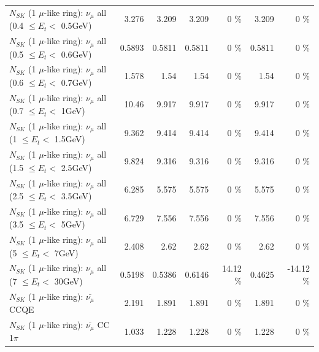 \begin{table}
\begin{tabular}{| l | r | r | r  r | r  r |}
       $N_{SK}$ (1 $\mu$-like ring): $\nu_{\mu}$ all (0.4 $\leq E_{t} <$ 0.5GeV) &           3.276 &           3.209 &           3.209 &        0 \%  &           3.209 &        0 \%  \\ 
       $N_{SK}$ (1 $\mu$-like ring): $\nu_{\mu}$ all (0.5 $\leq E_{t} <$ 0.6GeV) &          0.5893 &          0.5811 &          0.5811 &        0 \%  &          0.5811 &        0 \%  \\ 
       $N_{SK}$ (1 $\mu$-like ring): $\nu_{\mu}$ all (0.6 $\leq E_{t} <$ 0.7GeV) &           1.578 &            1.54 &            1.54 &        0 \%  &            1.54 &        0 \%  \\ 
         $N_{SK}$ (1 $\mu$-like ring): $\nu_{\mu}$ all (0.7 $\leq E_{t} <$ 1GeV) &           10.46 &           9.917 &           9.917 &        0 \%  &           9.917 &        0 \%  \\ 
         $N_{SK}$ (1 $\mu$-like ring): $\nu_{\mu}$ all (1 $\leq E_{t} <$ 1.5GeV) &           9.362 &           9.414 &           9.414 &        0 \%  &           9.414 &        0 \%  \\ 
       $N_{SK}$ (1 $\mu$-like ring): $\nu_{\mu}$ all (1.5 $\leq E_{t} <$ 2.5GeV) &           9.824 &           9.316 &           9.316 &        0 \%  &           9.316 &        0 \%  \\ 
       $N_{SK}$ (1 $\mu$-like ring): $\nu_{\mu}$ all (2.5 $\leq E_{t} <$ 3.5GeV) &           6.285 &           5.575 &           5.575 &        0 \%  &           5.575 &        0 \%  \\ 
         $N_{SK}$ (1 $\mu$-like ring): $\nu_{\mu}$ all (3.5 $\leq E_{t} <$ 5GeV) &           6.729 &           7.556 &           7.556 &        0 \%  &           7.556 &        0 \%  \\ 
           $N_{SK}$ (1 $\mu$-like ring): $\nu_{\mu}$ all (5 $\leq E_{t} <$ 7GeV) &           2.408 &            2.62 &            2.62 &        0 \%  &            2.62 &        0 \%  \\ 
          $N_{SK}$ (1 $\mu$-like ring): $\nu_{\mu}$ all (7 $\leq E_{t} <$ 30GeV) &          0.5198 &          0.5386 &          0.6146 &    14.12 \%  &          0.4625 &   -14.12 \%  \\ 
\hline
\hline
\hline
                              $N_{SK}$ (1 $\mu$-like ring): $\bar{\nu_\mu}$ CCQE &           2.191 &           1.891 &           1.891 &        0 \%  &           1.891 &        0 \%  \\ 
                         $N_{SK}$ (1 $\mu$-like ring): $\bar{\nu_\mu}$ CC 1$\pi$ &           1.033 &           1.228 &           1.228 &        0 \%  &           1.228 &        0 \%  \\ 

\end{tabular}
\end{table}
